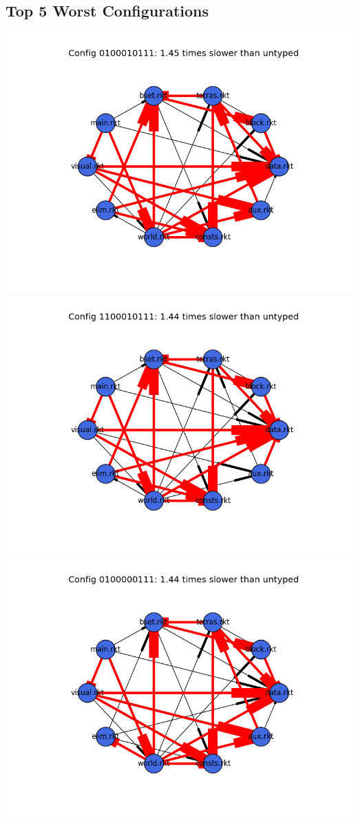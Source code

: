\documentclass{article}
\begin{document}
\begin{itemize}
\subsection{Top 5 Worst Configurations}
\includegraphics[width=\textwidth]{tetris-module-graph-0100010111.png}
\includegraphics[width=\textwidth]{tetris-module-graph-1100010111.png}
\includegraphics[width=\textwidth]{tetris-module-graph-0100000111.png}

\end{itemize}
\end{document}
